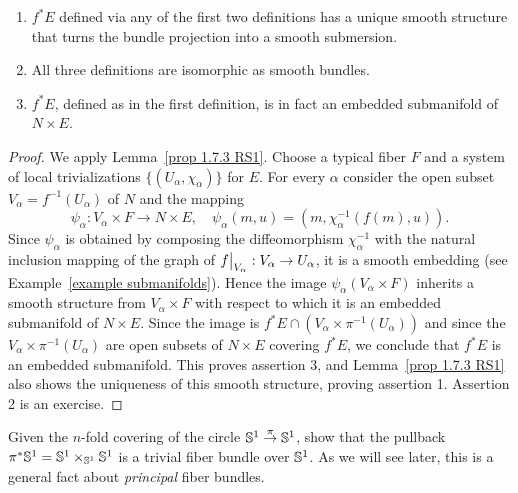 \begin{prop}[{{\cite[Prop.~2.6.1]{RS1}}}]\label{prop 2.6.1 RS1}
\begin{enumerate}
    \item $f^\ast E$ defined via any of the first two definitions has a unique smooth structure that turns the bundle projection into a smooth submersion.
    \item All three definitions are isomorphic as smooth bundles.
    \item $f^\ast E$, defined as in the first definition, is in fact an embedded submanifold of $N\times E$.
\end{enumerate} 
\end{prop}
\begin{proof}
    We apply Lemma~\ref{prop 1.7.3 RS1}. Choose a typical fiber $F$ and a system of local trivializations $\{(U_\alpha,\chi_\alpha)\}$ for $E$. For every $\alpha$ consider the open subset $V_\alpha=f^{-1}(U_\alpha)$ of $N$ and the mapping  
    \[\psi_\alpha:V_\alpha\times F\to N\times E,\quad \psi_\alpha(m,u)=(m,\chi_\alpha^{-1}(f(m),u)).\]
    Since $\psi_\alpha$ is obtained by composing the diffeomorphism $\chi_\alpha^{-1}$ with the natural inclusion mapping of the graph of $\restr{f}{V_\alpha}:V_\alpha\to U_\alpha$, it is a smooth embedding (see Example~\ref{example submanifolds}). Hence the image $\psi_\alpha(V_\alpha\times F)$ inherits a smooth structure from $V_\alpha\times F$ with respect to which it is an embedded submanifold of $N\times E$. Since the image is $f^\ast E\cap (V_\alpha\times\pi^{-1}(U_\alpha))$ and since the $V_\alpha\times\pi^{-1}(U_\alpha)$ are open subsets of $N\times E$ covering $f^\ast E$, we conclude that $f^\ast E$ is an embedded submanifold. This proves assertion 3, and Lemma~\ref{prop 1.7.3 RS1} also shows the uniqueness of this smooth structure, proving assertion 1. Assertion 2 is an exercise.
\end{proof}

\begin{xca}
    Given the $n$-fold covering of the circle $\mathbb{S}^1\overset{\pi}{\to}\mathbb{S}^1$, show that the pullback $\pi^\ast \mathbb{S}^1=\mathbb{S}^1\times_{\mathbb{S}^1} \mathbb{S}^1$ is a trivial fiber bundle over $\mathbb{S}^1$. As we will see later, this is a general fact about \emph{principal} fiber bundles.
\end{xca}

